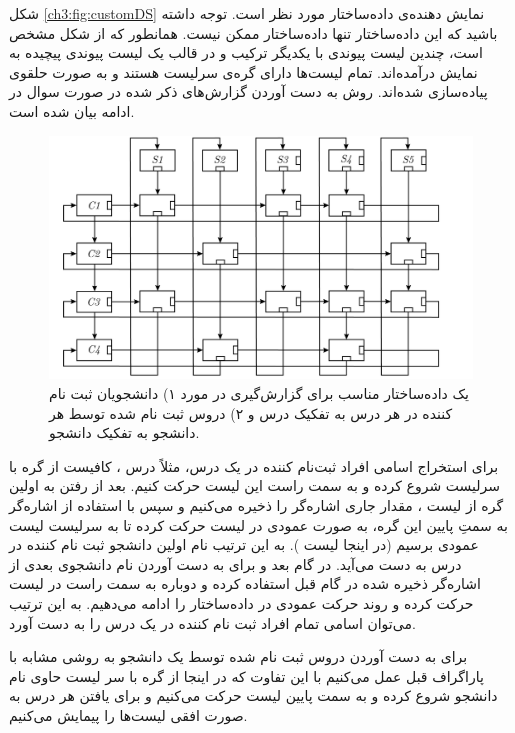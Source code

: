 
شکل {\eqref{ch3:fig:customDS}} نمایش دهنده‌ی داده‌ساختار مورد نظر است. توجه داشته باشید که این داده‌ساختار تنها داده‌ساختار ممکن نیست. همانطور که از شکل مشخص است، چندین لیست پیوندی با یکدیگر ترکیب و در قالب یک لیست پیوندی پیچیده به نمایش درآمده‌اند. تمام لیست‌ها دارای گره‌ی سرلیست هستند و به صورت حلقوی پیاده‌سازی شده‌اند. روش به دست آوردن گزارش‌های ذکر شده در صورت سوال در ادامه بیان شده است.

\begin{figure}
\begin{center}
\includegraphics[scale=0.33]{figs/ch3/custom_ds.pdf}
\caption{%
یک داده‌ساختار مناسب برای گزارش‌گیری در مورد ۱) دانشجویان ثبت نام کننده در هر درس به تفکیک درس و ۲) دروس ثبت نام شده توسط هر دانشجو به تفکیک دانشجو.
}\label{ch3:fig:customDS}
\end{center}
\end{figure}

برای استخراج اسامی افراد ثبت‌نام کننده در یک درس، مثلاً درس {} ، کافیست از گره با سرلیست {} شروع کرده و به سمت راست این لیست حرکت کنیم. بعد از رفتن به اولین گره از لیست {} ، مقدار جاری اشاره‌گر را ذخیره می‌کنیم و سپس با استفاده از اشاره‌گر به سمتِ پایین این گره، به صورت عمودی در لیست حرکت کرده تا به سرلیست لیست عمودی برسیم (در اینجا لیست {}). به این ترتیب نام اولین دانشجو ثبت نام کننده در درس {} به دست می‌‌آید. در گام بعد و برای به دست آوردن نام دانشجوی بعدی از اشاره‌گر ذخیره شده در گام قبل استفاده کرده و دوباره به سمت راست در لیست {} حرکت کرده و روند حرکت عمودی در داده‌ساختار را ادامه می‌دهیم. به این ترتیب می‌توان اسامی تمام افراد ثبت نام کننده در یک درس را به دست آورد.

برای به دست آوردن دروس ثبت نام شده توسط یک دانشجو به روشی مشابه با پاراگراف قبل عمل می‌کنیم با این تفاوت که در اینجا از گره با سر لیست حاوی نام دانشجو شروع کرده و به سمت پایین لیست حرکت می‌کنیم و برای یافتن هر درس به صورت افقی لیست‌ها را پیمایش می‌کنیم.
